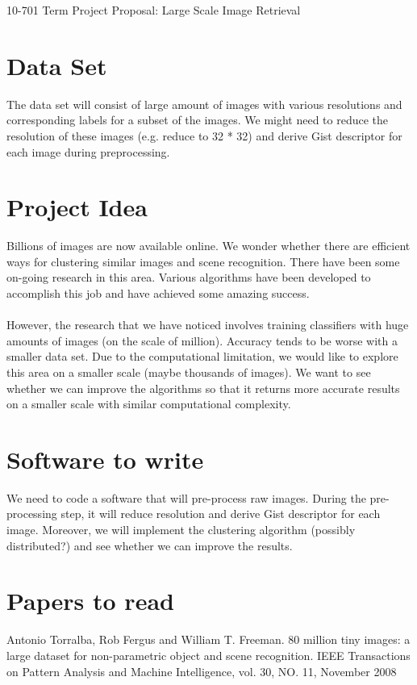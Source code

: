 \documentclass[11pt]{article}
\begin{document}
\medskip                        

\thispagestyle{plain}
\begin{center}                  %
{\Large 10-701 Term Project Proposal: Large Scale Image Retrieval}
\end{center}

\section*{Data Set}
The data set will consist of large amount of images with various resolutions and corresponding labels for a subset of the images. We might need to reduce the resolution of these images (e.g. reduce to 32 * 32) and derive Gist descriptor for each image during preprocessing.

\section*{Project Idea}
Billions of images are now available online. We wonder whether there are efficient ways for clustering similar images and scene recognition. There have been some on-going research in this area. Various algorithms have been developed to accomplish this job and have achieved some amazing success.\\
\\
However, the research that we have noticed involves training classifiers with huge amounts of images (on the scale of million). Accuracy tends to be worse with a smaller data set. Due to the computational limitation, we would like to explore this area on a smaller scale (maybe thousands of images). We want to see whether we can improve the algorithms so that it returns more accurate results on a smaller scale with similar computational complexity.

\section*{Software to write}
We need to code a software that will pre-process raw images. During the pre-processing step, it will reduce resolution and derive Gist descriptor for each image. Moreover, we will implement the clustering algorithm (possibly distributed?) and see whether we can improve the results.

\section*{Papers to read}
Antonio Torralba, Rob Fergus and William T. Freeman.	 80 million tiny images: a large dataset for non-parametric object and scene recognition. IEEE Transactions on Pattern Analysis and Machine Intelligence, vol. 30, NO. 11, November 2008
\end{document}
